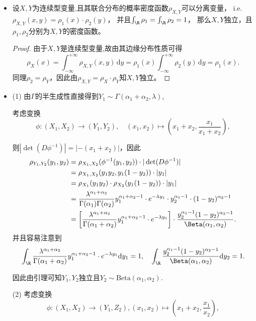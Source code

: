 \begin{itemize}
\item[$\boxed{\textbf{一个引理}}$]
设$X,Y$为连续型变量,且其联合分布的概率密度函数$\rho_{X,Y}$可以分离变量，
i.e. $\rho_{X,Y}(x,y) = \rho_1(x) \cdot \rho_2(y)$，
并且$\int_{\R} \rho_1 = \int_{\R} \rho_2 = 1$，
那么$X,Y$独立，且$\rho_1,\rho_2$分别为$X,Y$的密度函数。

\begin{proof}
    由于$X,Y$是连续型变量,故由其边缘分布性质可得
    \[\rho_X(x) = \int_{-\infty}^{+\infty} \rho_{X,Y}(x,y)\,\mathrm{d}y 
    = \rho_1(x)\int_{-\infty}^{+\infty}\rho_2(y)\,\mathrm{d}y = \rho_1(x).\]
    同理$\rho_2 = \rho_Y$，因此由$\rho_{X,Y} = \rho_X \cdot \rho_Y$知$X,Y$独立。
\end{proof}

\item[8.1]
(1)  由$\Gamma$的半生成性直接得到$Y_1 \sim \Gamma(\alpha_1 + \alpha_2, \lambda)$,

考虑变换
\[\phi:(X_1,X_2) \to (Y_1, Y_2), \quad (x_1, x_2) \mapsto \left(x_1+x_2, \frac{x_1}{x_1+x_2}\right),\]

则$|\det(D\phi^{-1})| = |-(x_1+x_2)|$，因此
\begin{align}
    \rho_{Y_1, Y_2} (y_1, y_2) &= \rho_{X_1, X_2}(\phi^{-1}(y_1, y_2)) \cdot |\det(D\phi^{-1})|\\
&= \rho_{X_1, X_2}(y_1y_2, y_1(1-y_2))  \cdot |y_1| \\
&= \rho_{X_1}(y_1y_2) \cdot \rho_{X_2} (y_1(1-y_2)) \cdot |y_1| \\
&= \frac{\lambda^{\alpha_1 + \alpha_2}}{\Gamma(\alpha_1)\Gamma(\alpha_2)} y_1^{\alpha_1 + \alpha_2 - 1} \cdot e^{-\lambda y_1} \cdot y_2^{\alpha_1-1} \cdot (1-y_2)^{\alpha_2 -1}\\
&= \left[\frac{\lambda^{\alpha_1 + \alpha_2}}{\Gamma(\alpha_1+\alpha_2)}y_1^{\alpha_1 + \alpha_2 - 1} \cdot e^{-\lambda y_1}\right] 
\cdot \frac{y_2^{\alpha_1 - 1}(1-y_2)^{\alpha_2 - 1}}{\Beta(\alpha_1, \alpha_2)}.
\end{align}
并且容易注意到
\[\int_{\R} \frac{\lambda^{\alpha_1 + \alpha_2}}{\Gamma(\alpha_1+\alpha_2)}y_1^{\alpha_1 + \alpha_2 - 1} \cdot e^{-\lambda y_1} \mathrm{d} y_1 = 1, 
\quad \int_{\R}\frac{y_2^{\alpha_1 - 1}(1-y_2)^{\alpha_2 - 1}}{\Beta(\alpha_1, \alpha_2)}\mathrm{d}y_2 = 1.\]

因此由引理可知$Y_1, Y_2$独立且$Y_2 \sim \mathrm{Beta}(\alpha_1, \alpha_2)$.

(2)
考虑变换\[\phi:(X_1,X_2) \to (Y_1, Z_2), (x_1, x_2) \mapsto \left(x_1+x_2, \frac{x_1}{x_2}\right),\]


\end{itemize}
